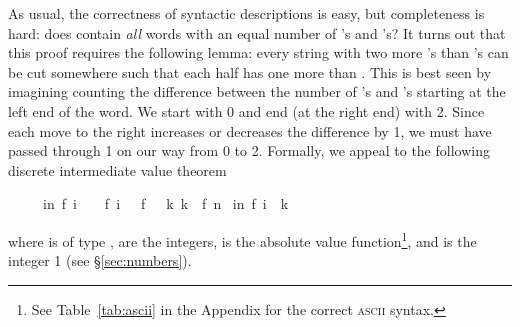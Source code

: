 \begin{isabellebody}
\begin{isamarkuptext}
As usual, the correctness of syntactic descriptions is easy, but completeness
is hard: does  contain \emph{all} words with an equal number of
's and 's? It turns out that this proof requires the
following lemma: every string with two more 's than 's can be cut somewhere such that each half has one more  than
. This is best seen by imagining counting the difference between the
number of 's and 's starting at the left end of the
word. We start with 0 and end (at the right end) with 2. Since each move to the
right increases or decreases the difference by 1, we must have passed through
1 on our way from 0 to 2. Formally, we appeal to the following discrete
intermediate value theorem 
\begin{isabelle}%
\ \ \ \ \ {}{}i{}n{}\ {}f\ {}i\ {}\ {}{}\ {}\ f\ i{}\ {}\ {}{}\ f\ {}\ {}\ k{}\ k\ {}\ f\ n{}\isanewline
{}\ {}i{}n{}\ f\ i\ {}\ k%
\end{isabelle}
where  is of type ,  are the integers,
 is the absolute value function\footnote{See
Table~\ref{tab:ascii} in the Appendix for the correct \textsc{ascii}
syntax.}, and  is the integer 1 (see \S\ref{sec:numbers}).


\end{isamarkuptext}
\end{isabellebody}
